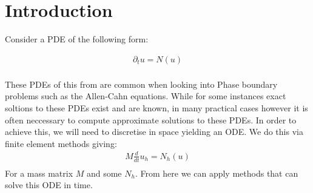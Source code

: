 \section{Introduction}

Consider a PDE of the following form:

\begin{align*}
    \partial_t u = N(u)\\
\end{align*}

These PDEs of this from are common when looking into Phase boundary problems such as the Allen-Cahn equations. %
While for some instances exact soltions to these PDEs exist and are known, in many practical cases however it is often neccessary to compute approximate solutions to these PDEs.
In order to achieve this, we will need to discretise in space yielding an ODE.
We do this via finite element methods giving:
\begin{align*}
    M\frac d{dt} u_h = N_h(u)\\
\end{align*}
For a mass matrix $M$ and some $N_h$.
From here we can apply methods that can solve this ODE in time.

